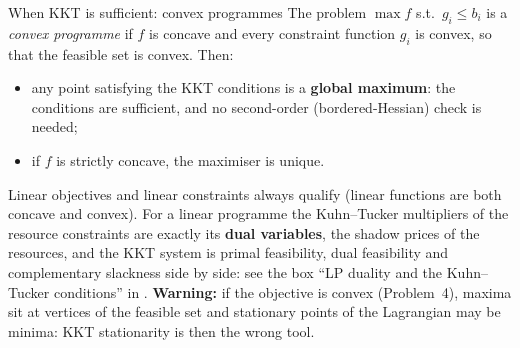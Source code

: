 \begin{rulebox}{When KKT is sufficient: convex programmes}
The problem $\max f$ s.t.\ $g_i \leq b_i$ is a \emph{convex programme} if $f$ is concave and every constraint function
$g_i$ is convex, so that the feasible set is convex. Then:
\begin{itemize}[leftmargin=1.6em,itemsep=0.3ex]
  \item any point satisfying the KKT conditions is a \textbf{global
        maximum}: the conditions are sufficient, and no second-order
        (bordered-Hessian) check is needed;
  \item if $f$ is strictly concave, the maximiser is unique.
\end{itemize}
Linear objectives and linear constraints always qualify (linear functions
are both concave and convex). For a linear programme the Kuhn--Tucker
multipliers of the resource constraints are exactly its \textbf{dual
variables}, the shadow prices of the resources, and the KKT system is
primal feasibility, dual feasibility and complementary slackness side by
side: see the box ``LP duality and the Kuhn--Tucker conditions'' in
. \textbf{Warning:} if the objective is convex
(Problem~4), maxima sit at vertices of the feasible set and stationary
points of the Lagrangian may be minima: KKT stationarity is then the wrong
tool.
\end{rulebox}

